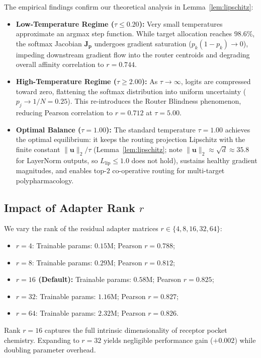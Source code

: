 \documentclass{article}
\theoremstyle{definition}
\begin{document}
The empirical findings confirm our theoretical analysis in Lemma~\ref{lem:lipschitz}:
\begin{itemize}[leftmargin=1.5em,noitemsep]
    \item \textbf{Low-Temperature Regime ($\tau \le 0.20$):} Very small temperatures approximate an argmax step function. While target allocation reaches $98.6\%$, the softmax Jacobian $\mathbf{J}_{\mathbf{p}}$ undergoes gradient saturation ($p_k(1-p_k) \to 0$), impeding downstream gradient flow into the router centroids and degrading overall affinity correlation to $r = 0.744$.
    \item \textbf{High-Temperature Regime ($\tau \ge 2.00$):} As $\tau \to \infty$, logits are compressed toward zero, flattening the softmax distribution into uniform uncertainty ($p_j \to 1/N = 0.25$). This re-introduces the Router Blindness phenomenon, reducing Pearson correlation to $r = 0.712$ at $\tau = 5.00$.
    \item \textbf{Optimal Balance ($\tau = 1.00$):} The standard temperature $\tau = 1.00$ achieves the optimal equilibrium: it keeps the routing projection Lipschitz with the finite constant $\|\mathbf{u}\|_2/\tau$ (Lemma~\ref{lem:lipschitz}; note $\|\mathbf{u}\|_2 \approx \sqrt{d} \approx 35.8$ for LayerNorm outputs, so $L_{\text{lip}} \le 1.0$ does not hold), sustains healthy gradient magnitudes, and enables top-$2$ co-operative routing for multi-target polypharmacology.
\end{itemize}

\subsection{Impact of Adapter Rank \texorpdfstring{$r$}{r}}
We vary the rank of the residual adapter matrices $r \in \{4, 8, 16, 32, 64\}$:
\begin{itemize}[leftmargin=1.5em,noitemsep]
    \item $r = 4$: Trainable params: $0.15\text{M}$; Pearson $r = 0.788$;
    \item $r = 8$: Trainable params: $0.29\text{M}$; Pearson $r = 0.812$;
    \item \textbf{$r = 16$ (Default):} Trainable params: $0.58\text{M}$; Pearson $r = 0.825$;
    \item $r = 32$: Trainable params: $1.16\text{M}$; Pearson $r = 0.827$;
    \item $r = 64$: Trainable params: $2.32\text{M}$; Pearson $r = 0.826$.
\end{itemize}
Rank $r = 16$ captures the full intrinsic dimensionality of receptor pocket chemistry. Expanding to $r = 32$ yields negligible performance gain ($+0.002$) while doubling parameter overhead.
\end{document}
